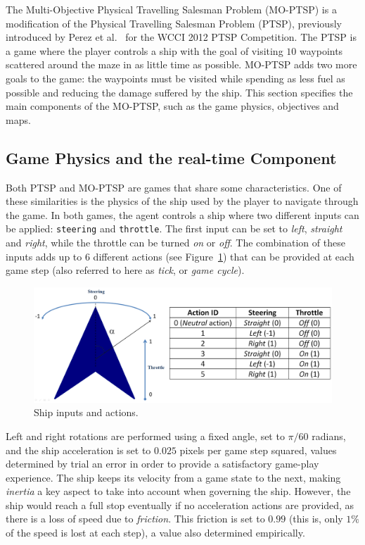 \documentclass[conference]{IEEEtran}
\begin{document}
The Multi-Objective Physical Travelling Salesman Problem (MO-PTSP) is a modification of the Physical Travelling Salesman Problem (PTSP), previously introduced by Perez et al.~\cite{PerezCEC2012} for the WCCI 2012 PTSP Competition. The PTSP is a game where the player controls a ship with the goal of visiting $10$ waypoints scattered around the maze in as little time as possible. MO-PTSP adds two more goals to the game: the waypoints must be visited while spending as less fuel as possible and reducing the damage suffered by the ship. This section specifies the main components of the MO-PTSP, such as the game physics, objectives and maps. 

\subsection{Game Physics and the real-time Component}

Both PTSP and MO-PTSP are games that share some characteristics. One of these similarities is the physics of the ship used by the player to navigate through the game. In both games, the agent controls a ship where two different inputs can be applied: \texttt{steering} and \texttt{throttle}. The first input can be set to \textit{left}, \textit{straight} and \textit{right}, while the throttle can be turned \textit{on} or \textit{off}. The combination of these inputs adds up to $6$ different actions (see Figure~\ref{fig:ship}) that can be provided at each game step (also referred to here as \textit{tick}, or \textit{game cycle}). 

\begin{figure} [!h]
	\begin{center}
	\includegraphics[width=0.8\columnwidth]{img/ShipActions}
	\caption{Ship inputs and actions.}
	\label{fig:ship}
	\end{center}
\end{figure}

Left and right rotations are performed using a fixed angle, set to $\pi/60$ radians, and the ship acceleration is set to $0.025$ pixels per game step squared, values determined by trial an error in order to provide a satisfactory game-play experience. The ship keeps its velocity from a game state to the next, making \textit{inertia} a key aspect to take into account when governing the ship. However, the ship would reach a full stop eventually if no acceleration actions are provided, as there is a loss of speed due to \textit{friction}. This friction is  set to $0.99$ (this is, only $1\%$ of the speed is lost at each step), a value also determined empirically. 
\end{document}
